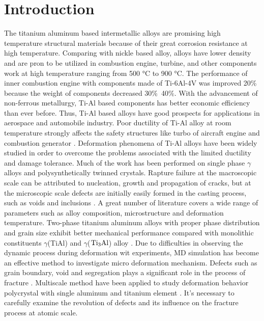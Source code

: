 \documentclass[metals,article,submit,moreauthors,pdftex,10pt,a4paper]{Definitions/mdpi}
\begin{document}
\section{Introduction}
The titanium  aluminum based intermetallic alloys are promising high temperature structural materials because of their great corrosion resistance at high temperature. Comparing with nickle based alloy,  alloys have lower density and are pron to be utilized in combustion engine, turbine, and other components work at high temperature ranging from 500 \si{\degreeCelsius} to 900 \si{\degreeCelsius}. The performance of inner combustion engine with components made of Ti-6Al-4V was improved  20\% because the weight of components decreased 30\%~40\%. With the advancement of non-ferrous metallurgy, Ti-Al based components has better economic efficiency than ever before. Thus, Ti-Al based alloys have good prospects for applications in aerospace and automobile industry. 
Poor ductility of Ti-Al alloy  at room temperature strongly affects the safety structures like turbo of aircraft engine and combustion generator \cite{Munz2017}. Deformation phenomena of Ti-Al alloys have been widely studied in order to overcome the problems associated with the limited ductility and damage tolerance.  Much of the work has been performed on single phase $\gamma$ alloys and polysynthetically twinned crystals\cite{Appel2016}. Rapture failure at the macroscopic scale can be attributed to nucleation, growth and propagation of cracks, but at the microscopic scale defects are initially easily formed in the casting process, such as voids and inclusions \cite{Tang2014}. A great number of literature covers a wide range of parameters such as alloy composition, microstructure and deformation temperature. Two-phase titanium aluminum alloys with proper phase distribution and grain size exhibit better mechanical performance compared with monolithic constituents $\gamma$(TiAl) and $\gamma$($\rm Ti_3Al$) alloy \cite{Kim1995}. Due to difficulties in observing the dynamic process during deformation wit experiments, MD simulation has become an effective method to investigate micro deformation mechanism. Defects such as grain boundary, void and segregation plays a significant role in the process of fracture \cite{Larsen2016}. Multiscale method have been applied to study deformation behavior polycrystal with single aluminum \cite{Groh2009} and titanium element \cite{Liu2018}. It's necessary to carefully examine the revolution of defects and its influence on the fracture process at atomic scale. 
\end{document}
